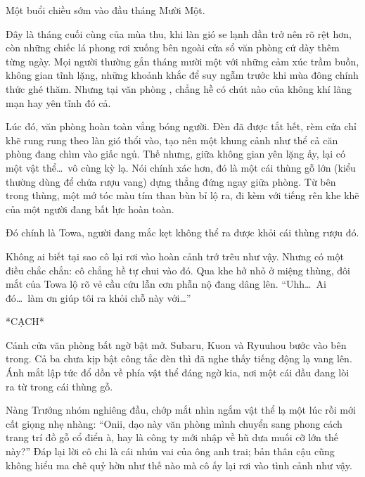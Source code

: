 \documentclass[../main.tex]{subfiles}
\begin{document}

Một buổi chiều sớm vào đầu tháng Mười Một.

Đây là tháng cuối cùng của mùa thu, khi làn gió se lạnh dần trở nên rõ rệt hơn, còn những chiếc lá phong rơi xuống bên ngoài cửa sổ văn phòng cứ dày thêm từng ngày. Mọi người thường gắn tháng mười một với những cảm xúc trầm buồn, không gian tĩnh lặng, những khoảnh khắc để suy ngẫm trước khi mùa đông chính thức ghé thăm. Nhưng tại văn phòng \hll, chẳng hề có chút nào của không khí lãng mạn hay yên tĩnh đó cả.

Lúc đó, văn phòng hoàn toàn vắng bóng người. Đèn đã được tắt hết, rèm cửa chỉ khẽ rung rung theo làn gió thổi vào, tạo nên một khung cảnh như thể cả căn phòng đang chìm vào giấc ngủ. Thế nhưng, giữa không gian yên lặng ấy, lại có một vật thể\dots\ vô cùng kỳ lạ. Nói chính xác hơn, đó là một cái thùng gỗ lớn (kiểu thường dùng để chứa rượu vang) dựng thẳng đứng ngay giữa phòng. Từ bên trong thùng, một mớ tóc màu tím than bùn bỉ lộ ra, đi kèm với tiếng rên khe khẽ của một người đang bất lực hoàn toàn.

Đó chính là Towa, người đang mắc kẹt không thể ra được khỏi cái thùng rượu đó.


Không ai biết tại sao cô lại rơi vào hoàn cảnh trớ trêu như vậy. Nhưng có một điều chắc chắn: cô chẳng hề tự chui vào đó. Qua khe hở nhỏ ở miệng thùng, đôi mắt của Towa lộ rõ vẻ cầu cứu lẫn cơn phẫn nộ đang dâng lên. ``Uhh\dots\ Ai đó\dots\ làm ơn giúp tôi ra khỏi chỗ này với\dots''

*CẠCH*

Cánh cửa văn phòng bất ngờ bật mở. Subaru, Kuon và Ryuuhou bước vào bên trong. Cả ba chưa kịp bật công tắc đèn thì đã nghe thấy tiếng động lạ vang lên. Ánh mắt lập tức đổ dồn về phía vật thể đáng ngờ kia, nơi một cái đầu đang lòi ra từ trong cái thùng gỗ.

Nàng Trưởng nhóm nghiêng đầu, chớp mắt nhìn ngắm vật thể lạ một lúc rồi mới cất giọng nhẹ nhàng: ``Onii, dạo này văn phòng mình chuyển sang phong cách trang trí đồ gỗ cổ điển à, hay là công ty mới nhập về hũ dưa muối cỡ lớn thế này?'' Đáp lại lời cô chi là cái nhún vai của ông anh trai; bản thân cậu cũng không hiểu ma chê quỷ hờn như thế nào mà cô ấy lại rơi vào tình cảnh như vậy.
\end{document}

